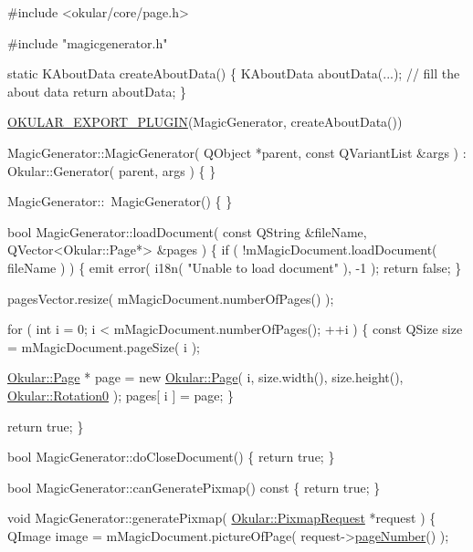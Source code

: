\begin{DoxyCode}
\textcolor{preprocessor}{#include <okular/core/page.h>}

\textcolor{preprocessor}{#include "magicgenerator.h"}

\textcolor{keyword}{static} KAboutData createAboutData()
\{
    KAboutData aboutData(...);
    \textcolor{comment}{// fill the about data}
    \textcolor{keywordflow}{return} aboutData;
\}

\hyperlink{generator_8h_a87d954a3809f78e33fb1cb8e2369a05c}{OKULAR\_EXPORT\_PLUGIN}(MagicGenerator, createAboutData())

MagicGenerator::MagicGenerator( QObject *parent, const QVariantList &args )
    : Okular::Generator( parent, args )
\{
\}

MagicGenerator::~MagicGenerator()
\{
\}

\textcolor{keywordtype}{bool} MagicGenerator::loadDocument( \textcolor{keyword}{const} QString &fileName, QVector<Okular::Page*> &pages )
\{
    \textcolor{keywordflow}{if} ( !mMagicDocument.loadDocument( fileName ) ) \{
        emit error( i18n( \textcolor{stringliteral}{"Unable to load document"} ), -1 );
        \textcolor{keywordflow}{return} \textcolor{keyword}{false};
    \}

    pagesVector.resize( mMagicDocument.numberOfPages() );

    \textcolor{keywordflow}{for} ( \textcolor{keywordtype}{int} i = 0; i < mMagicDocument.numberOfPages(); ++i ) \{
      \textcolor{keyword}{const} QSize size = mMagicDocument.pageSize( i );

      \hyperlink{classOkular_1_1Page}{Okular::Page} * page = \textcolor{keyword}{new} \hyperlink{classOkular_1_1Page}{Okular::Page}( i, size.width(), size.height(), 
      \hyperlink{namespaceOkular_a8556d00465f61ef533c6b027669e7da6aa4df8fc3dd09e30520c264c8d23d89c2}{Okular::Rotation0} );
      pages[ i ] = page;
    \}

    \textcolor{keywordflow}{return} \textcolor{keyword}{true};
\}

\textcolor{keywordtype}{bool} MagicGenerator::doCloseDocument()
\{
    \textcolor{keywordflow}{return} \textcolor{keyword}{true};
\}

\textcolor{keywordtype}{bool} MagicGenerator::canGeneratePixmap()\textcolor{keyword}{ const}
\textcolor{keyword}{}\{
    \textcolor{keywordflow}{return} \textcolor{keyword}{true};
\}

\textcolor{keywordtype}{void} MagicGenerator::generatePixmap( \hyperlink{classOkular_1_1PixmapRequest}{Okular::PixmapRequest} *request )
\{
    QImage image = mMagicDocument.pictureOfPage( request->\hyperlink{classOkular_1_1PixmapRequest_a50f959175182137dbb9e2dbd6ddd71aa}{pageNumber}() );


\end{DoxyCode}
